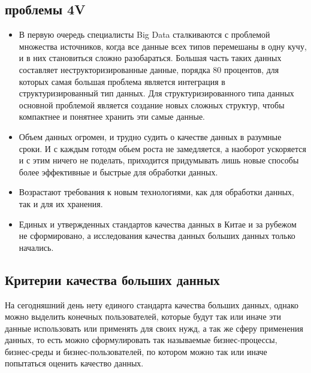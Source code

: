\documentclass{article}
\begin{document}
\subsection{проблемы 4V}

\begin{itemize}
    \item В первую очередь специалисты Big Data сталкиваются с проблемой множества источников, когда все данные всех типов перемешаны в одну кучу, и в них становиться сложно разобараться. Большая часть таких данных составляет неструкторизированные данные, порядка 80 процентов, для которых самая большая проблема является интеграция в структуризированный тип данных. Для структуризированного типа данных основной проблемой является создание новых сложных структур, чтобы компактнее и понятнее хранить эти самые данные. 
    \item Объем данных огромен, и трудно судить о качестве данных в разумные сроки. И с каждым готодм обьем роста не замедляется, а наоборот ускоряется и с этим ничего не поделать, приходится придумывать лишь новые способы более эффективные и быстрые для обработки данных.
    \item Возрастают требования к новым технологиями, как для обработки данных, так и для их хранения.
    \item Единых и утвержденных стандартов качества данных в Китае и за рубежом не сформировано, а исследования качества данных больших данных только начались.
\end{itemize}

\subsection{Критерии качества больших данных}

На сегодняшний день нету единого стандарта качества больших данных, однако можно выделить конечных пользователей, которые будут так или иначе эти данные использовать или применять для своих нужд, а так же сферу применения данных, то есть можно сформулировать так называемые бизнес-процессы, бизнес-среды и бизнес-пользователей, по котором можно так или иначе попытаться оценить качество данных.
\end{document}
